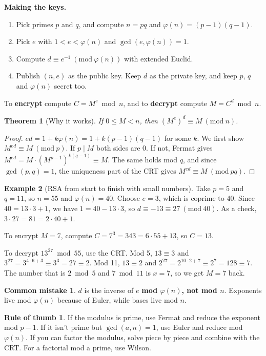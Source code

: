 \documentclass[11pt,a4paper]{article}
\newtheorem{theorem}{Theorem}[section]
\theoremstyle{definition}
\newtheorem{example}[theorem]{Example}
\newcommand{\md}[1]{\ (\mathrm{mod}\ #1)}
\theoremstyle{noteit}
\theoremstyle{note}
\newtheorem*{thumbrule}{Rule of thumb}
\newtheorem*{mistakeX}{Common mistake}
\newenvironment{mistake}{\begin{mistakeX}\leavevmode\marginpar{\raggedleft\vspace*{-0.9\baselineskip}\dbend}\ignorespaces}{\end{mistakeX}}
\begin{document}
\textbf{Making the keys.}
\begin{enumerate}
\item Pick primes $p$ and $q$, and compute $n=pq$ and $\varphi(n)=(p-1)(q-1)$.
\item Pick $e$ with $1<e<\varphi(n)$ and $\gcd(e,\varphi(n))=1$.
\item Compute $d\equiv e^{-1}\md{\varphi(n)}$ with extended Euclid.
\item Publish $(n,e)$ as the public key. Keep $d$ as the private key, and keep $p$, $q$ and $\varphi(n)$ secret too.
\end{enumerate}
To \textbf{encrypt} compute $C=M^e\bmod n$, and to \textbf{decrypt} compute $M=C^d\bmod n$.

\begin{theorem}[Why it works]
If $0\le M<n$, then $(M^e)^d\equiv M\md n$.
\end{theorem}
\begin{proof}
$ed=1+k\varphi(n)=1+k(p-1)(q-1)$ for some $k$. We first show $M^{ed}\equiv M\md p$. If $p\mid M$ both sides are $0$. If not, Fermat gives $M^{ed}=M\cdot(M^{p-1})^{k(q-1)}\equiv M$. The same holds mod $q$, and since $\gcd(p,q)=1$, the uniqueness part of the CRT gives $M^{ed}\equiv M\md{pq}$.
\end{proof}

\begin{example}[RSA from start to finish with small numbers]
Take $p=5$ and $q=11$, so $n=55$ and $\varphi(n)=40$. Choose $e=3$, which is coprime to 40. Since $40=13\cdot3+1$, we have $1=40-13\cdot3$, so $d\equiv-13\equiv27\md{40}$. As a check, $3\cdot27=81=2\cdot40+1$.

To encrypt $M=7$, compute $C=7^3=343=6\cdot55+13$, so $C=13$.

To decrypt $13^{27}\bmod55$, use the CRT. Mod 5, $13\equiv3$ and $3^{27}=3^{4\cdot6+3}\equiv3^3=27\equiv2$. Mod 11, $13\equiv2$ and $2^{27}=2^{10\cdot2+7}\equiv2^7=128\equiv7$. The number that is $2\bmod5$ and $7\bmod{11}$ is $x=7$, so we get $M=7$ back.
\end{example}

\begin{mistake}
$d$ is the inverse of $e$ \textbf{mod $\varphi(n)$, not mod $n$}. Exponents live mod $\varphi(n)$ because of Euler, while bases live mod $n$.
\end{mistake}

\begin{thumbrule}
If the modulus is prime, use Fermat and reduce the exponent mod $p-1$. If it isn't prime but $\gcd(a,n)=1$, use Euler and reduce mod $\varphi(n)$. If you can factor the modulus, solve piece by piece and combine with the CRT. For a factorial mod a prime, use Wilson.
\end{thumbrule}
\end{document}
